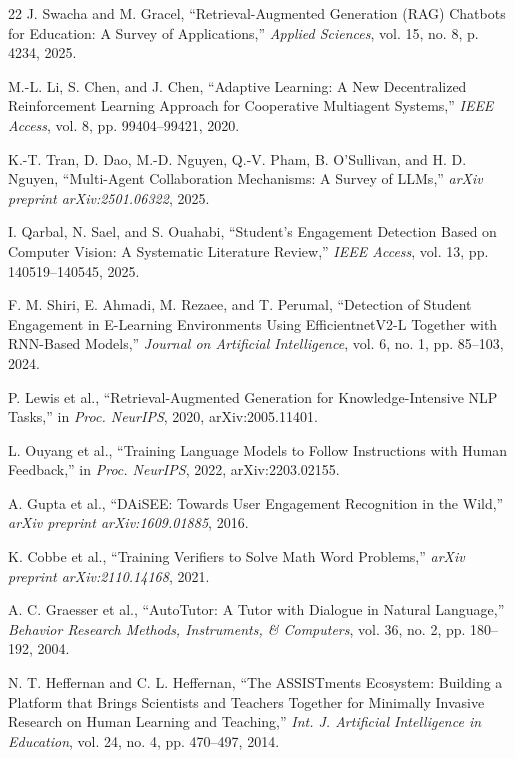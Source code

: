 \documentclass[conference, letterpaper]{IEEEtran}
\begin{document}
\begin{thebibliography}{22}
J. Swacha and M. Gracel, ``Retrieval-Augmented Generation (RAG) Chatbots for Education: A Survey of Applications,'' \emph{Applied Sciences}, vol. 15, no. 8, p. 4234, 2025.

M.-L. Li, S. Chen, and J. Chen, ``Adaptive Learning: A New Decentralized Reinforcement Learning Approach for Cooperative Multiagent Systems,'' \emph{IEEE Access}, vol. 8, pp. 99404--99421, 2020.

K.-T. Tran, D. Dao, M.-D. Nguyen, Q.-V. Pham, B. O'Sullivan, and H. D. Nguyen, ``Multi-Agent Collaboration Mechanisms: A Survey of LLMs,'' \emph{arXiv preprint arXiv:2501.06322}, 2025.

I. Qarbal, N. Sael, and S. Ouahabi, ``Student's Engagement Detection Based on Computer Vision: A Systematic Literature Review,'' \emph{IEEE Access}, vol. 13, pp. 140519--140545, 2025.

F. M. Shiri, E. Ahmadi, M. Rezaee, and T. Perumal, ``Detection of Student Engagement in E-Learning Environments Using EfficientnetV2-L Together with RNN-Based Models,'' \emph{Journal on Artificial Intelligence}, vol. 6, no. 1, pp. 85--103, 2024.

P. Lewis et al., ``Retrieval-Augmented Generation for Knowledge-Intensive NLP Tasks,'' in \emph{Proc. NeurIPS}, 2020, arXiv:2005.11401.

L. Ouyang et al., ``Training Language Models to Follow Instructions with Human Feedback,'' in \emph{Proc. NeurIPS}, 2022, arXiv:2203.02155.

A. Gupta et al., ``DAiSEE: Towards User Engagement Recognition in the Wild,'' \emph{arXiv preprint arXiv:1609.01885}, 2016.

K. Cobbe et al., ``Training Verifiers to Solve Math Word Problems,'' \emph{arXiv preprint arXiv:2110.14168}, 2021.

A. C. Graesser et al., ``AutoTutor: A Tutor with Dialogue in Natural Language,'' \emph{Behavior Research Methods, Instruments, \& Computers}, vol. 36, no. 2, pp. 180--192, 2004.

N. T. Heffernan and C. L. Heffernan, ``The ASSISTments Ecosystem: Building a Platform that Brings Scientists and Teachers Together for Minimally Invasive Research on Human Learning and Teaching,'' \emph{Int. J. Artificial Intelligence in Education}, vol. 24, no. 4, pp. 470--497, 2014.

\end{thebibliography}
\end{document}
